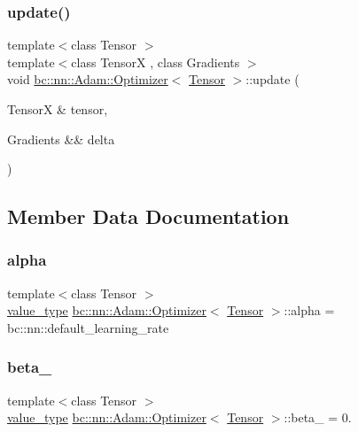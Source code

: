 \subsubsection{\texorpdfstring{update()}{update()}}
{\footnotesize\ttfamily template$<$class Tensor $>$ \\
template$<$class TensorX , class Gradients $>$ \\
void \hyperlink{structbc_1_1nn_1_1Adam_1_1Optimizer}{bc\+::nn\+::\+Adam\+::\+Optimizer}$<$ \hyperlink{namespacebc_a659391e47ab612be3ba6c18cf9c89159}{Tensor} $>$\+::update (\begin{DoxyParamCaption}\item[{TensorX \&}]{tensor,  }\item[{Gradients \&\&}]{delta }\end{DoxyParamCaption})\hspace{0.3cm}{\ttfamily [inline]}}



\subsection{Member Data Documentation}
\mbox{\label{structbc_1_1nn_1_1Adam_1_1Optimizer_a243fdeaa31efe0e3dfeec06fa2085c9c}} 
\subsubsection{\texorpdfstring{alpha}{alpha}}
{\footnotesize\ttfamily template$<$class Tensor $>$ \\
\hyperlink{structbc_1_1nn_1_1Adam_1_1Optimizer_a6c0f45fad49cbec9368339576806cb75}{value\+\_\+type} \hyperlink{structbc_1_1nn_1_1Adam_1_1Optimizer}{bc\+::nn\+::\+Adam\+::\+Optimizer}$<$ \hyperlink{namespacebc_a659391e47ab612be3ba6c18cf9c89159}{Tensor} $>$\+::alpha = bc\+::nn\+::default\+\_\+learning\+\_\+rate}

\mbox{\label{structbc_1_1nn_1_1Adam_1_1Optimizer_ac4b651475f627b4db5a0976acb2ee065}} 
\subsubsection{\texorpdfstring{beta\+\_}{beta\_1}}
{\footnotesize\ttfamily template$<$class Tensor $>$ \\
\hyperlink{structbc_1_1nn_1_1Adam_1_1Optimizer_a6c0f45fad49cbec9368339576806cb75}{value\+\_\+type} \hyperlink{structbc_1_1nn_1_1Adam_1_1Optimizer}{bc\+::nn\+::\+Adam\+::\+Optimizer}$<$ \hyperlink{namespacebc_a659391e47ab612be3ba6c18cf9c89159}{Tensor} $>$\+::beta\+\_ = 0.}

